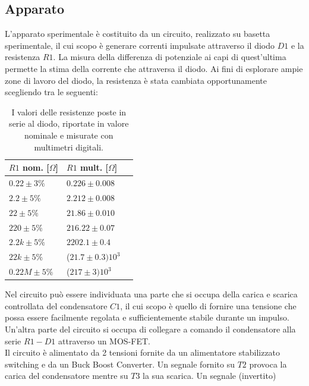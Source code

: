 \documentclass{article}[a4paper, oneside, 11pt]
\begin{document}
\subsection{Apparato}
L'apparato sperimentale è costituito da un circuito, realizzato su basetta 
sperimentale, il cui scopo è generare correnti impulsate attraverso il diodo 
$D1$ e la resistenza $R1$. La misura della differenza di potenziale ai capi di 
quest'ultima
permette la stima della corrente che attraversa il diodo. Ai fini di esplorare 
ampie zone 
di lavoro del diodo, la resistenza è stata cambiata opportunamente scegliendo 
tra le seguenti:
\begin{table}[H]
    \begin{center}
	\begin{tabular}{lll}
	    \toprule
	    $R1$ nom. [$\Omega$] & $R1$ mult. [$\Omega$] \\ 
	    \midrule
	    \midrule
	    $0.22 \pm 3 \% $         & $0.226 \pm 0.008$ \\
	    $2.2 \pm 5 \% $          & $2.212 \pm 0.008$ \\
	    $22 \pm 5 \% $           & $21.86 \pm 0.010$ \\ 
	    $220 \pm 5 \% $          & $216.22 \pm 0.07$ \\
	    $2.2 k \pm 5 \% $        & $2202.1 \pm 0.4$ \\
	    $22 k \pm 5 \% $         & ($21.7 \pm 0.3)10^3$ \\
	    $0.22 M \pm 5 \% $        & ($217 \pm 3)10^3$ \\
	    \bottomrule
	\end{tabular}
	\caption{I valori delle resistenze poste in serie al diodo, riportate in
		valore nominale e misurate con multimetri digitali. \label{tab:res}}
    \end{center}
\end{table}
Nel circuito può essere individuata una parte che si occupa della carica e 
scarica controllata del condensatore $C1$, il cui scopo è quello di fornire 
una tensione che possa essere facilmente regolata e sufficientemente stabile 
durante un impulso. Un'altra parte del circuito si occupa di collegare a 
comando il condensatore alla serie $R1-D1$ attraverso un MOS-FET.\\
Il circuito è alimentato da 2 tensioni fornite da un alimentatore stabilizzato 
switching e da un Buck Boost Converter. Un segnale fornito su $T2$ provoca la 
carica del condensatore mentre su $T3$ la sua scarica. Un segnale (invertito) 
\end{document}
